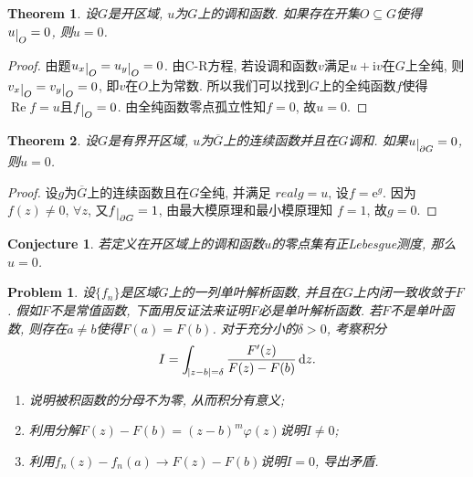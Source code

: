 \documentclass[a4paper, 12pt]{ctexart}
\newtheorem{theorem}{Theorem}[section]
\theoremstyle{plain}
\newtheorem{problem}{Problem}[section]
\newtheorem{conjecture}[proposition]{Conjecture}
\theoremstyle{plain}
\theoremstyle{plain}
\theoremstyle{nonumberplain}
\newtheorem{proof}{Proof}
\DeclareMathOperator*{\real}{Re}
\newcommand*{\diff}{\mathop{}\!\mathrm{d}}
\newcommand*{\me}{\mathrm{e}}
\newcommand*{\mi}{\mathrm{i}}
\newcommand*{\restrict}[1]{\raisebox{-.5ex}{$\vert$}_{#1}}
\begin{document}
    \begin{theorem}
        设$G$是开区域, $u$为$G$上的调和函数. 如果存在开集$O\subseteq G$使得
        $u\restrict{O}=0$, 则$u=0$.
    \end{theorem}

    \begin{proof}
        由题$u_{x}\restrict{O}=u_{y}\restrict{O}=0$.
        由C-R方程, 若设调和函数$v$满足$u+\mi v$在$G$上全纯,
        则$v_{x}\restrict{O}=v_{y}\restrict{O}=0$, 即$v$在$O$上为常数.
        所以我们可以找到$G$上的全纯函数$f$使得$\real{f}=u$且$f\restrict{O}=0$.
        由全纯函数零点孤立性知$f=0$, 故$u=0$.
    \end{proof}

    \begin{theorem}
        设$G$是有界开区域, $u$为$\overline{G}$上的连续函数并且在$G$调和.
        如果$u\restrict{\partial G}=0$, 则$u=0$.
    \end{theorem}

    \begin{proof}
        设$g$为$\overline{G}$上的连续函数且在$G$全纯, 并满足
        $real{g}=u$, 设$f=\me^{g}$. 因为$f(z)\neq 0$, $\forall z$,
        又$f\restrict{\partial G}=1$, 由最大模原理和最小模原理知
        $f=1$, 故$g=0$.
    \end{proof}

    \begin{conjecture}
        若定义在开区域上的调和函数$u$的零点集有正Lebesgue测度, 那么$u=0$.
    \end{conjecture}

    \begin{problem}
        设$\{f_{n}\}$是区域$G$上的一列单叶解析函数, 并且在$G$上内闭一致收敛于$F$.
        假如$F$不是常值函数, 下面用反证法来证明$F$必是单叶解析函数.
        若$F$不是单叶函数, 则存在$a\neq b$使得$F(a)=F(b)$.
        对于充分小的$\delta>0$, 考察积分
        \begin{equation}
            I=\int_{\abs{z-b}=\delta}{\frac{F'(z)}{F(z)-F(b)}\diff{z}}.
        \end{equation}
        \begin{enumerate}[\hspace{2em}(1)]
            \item 说明被积函数的分母不为零, 从而积分有意义;
            \item 利用分解$F(z)-F(b)=(z-b)^{m}\varphi(z)$说明$I\neq 0$;
            \item 利用$f_{n}(z)-f_{n}(a)\to F(z)-F(b)$说明$I=0$, 导出矛盾.
        \end{enumerate}
    \end{problem}


\end{document}
